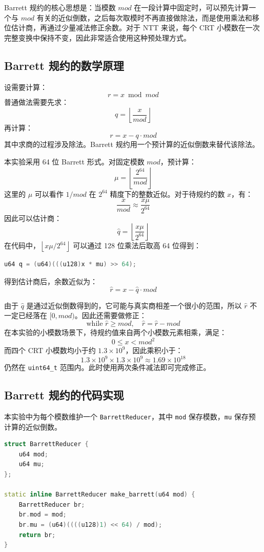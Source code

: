 \documentclass[a4paper]{article}
\begin{document}
Barrett 规约的核心思想是：当模数 $mod$ 在一段计算中固定时，可以预先计算一个与 $mod$ 有关的近似倒数，之后每次取模时不再直接做除法，而是使用乘法和移位估计商，再通过少量减法修正余数。对于 NTT 来说，每个 CRT 小模数在一次完整变换中保持不变，因此非常适合使用这种预处理方式。

\subsection{Barrett 规约的数学原理}

设需要计算：
\[
r=x\bmod mod
\]
普通做法需要先求：
\[
q=\left\lfloor \frac{x}{mod}\right\rfloor
\]
再计算：
\[
r=x-q\cdot mod
\]
其中求商的过程涉及除法。Barrett 规约用一个预计算的近似倒数来替代该除法。

本实验采用 64 位 Barrett 形式。对固定模数 $mod$，预计算：
\[
\mu=\left\lfloor \frac{2^{64}}{mod}\right\rfloor
\]
这里的 $\mu$ 可以看作 $1/mod$ 在 $2^{64}$ 精度下的整数近似。对于待规约的数 $x$，有：
\[
\frac{x}{mod}\approx \frac{x\mu}{2^{64}}
\]
因此可以估计商：
\[
\hat{q}=\left\lfloor \frac{x\mu}{2^{64}}\right\rfloor
\]
在代码中，$\left\lfloor x\mu/2^{64}\right\rfloor$ 可以通过 128 位乘法后取高 64 位得到：
\begin{lstlisting}[language=C++]
u64 q = (u64)(((u128)x * mu) >> 64);
\end{lstlisting}
得到估计商后，余数近似为：
\[
\hat{r}=x-\hat{q}\cdot mod
\]

由于 $\hat{q}$ 是通过近似倒数得到的，它可能与真实商相差一个很小的范围，所以 $\hat{r}$ 不一定已经落在 $[0,mod)$。因此还需要做修正：
\[
\text{while } \hat{r}\ge mod,\quad \hat{r}=\hat{r}-mod
\]
在本实验的小模数场景下，待规约值来自两个小模数元素相乘，满足：
\[
0\le x<mod^2
\]
而四个 CRT 小模数均小于约 $1.3\times 10^9$，因此乘积小于：
\[
1.3\times 10^9 \times 1.3\times 10^9 \approx 1.69\times 10^{18}
\]
仍然在 \texttt{uint64\_t} 范围内。此时使用两次条件减法即可完成修正。

\subsection{Barrett 规约的代码实现}

本实验中为每个模数维护一个 \texttt{BarrettReducer}，其中 \texttt{mod} 保存模数，\texttt{mu} 保存预计算的近似倒数。

\begin{lstlisting}[language=C++,title=Barrett 参数预计算]
struct BarrettReducer {
    u64 mod;
    u64 mu;
};

static inline BarrettReducer make_barrett(u64 mod) {
    BarrettReducer br;
    br.mod = mod;
    br.mu = (u64)((((u128)1) << 64) / mod);
    return br;
}
\end{lstlisting}
\end{document}
